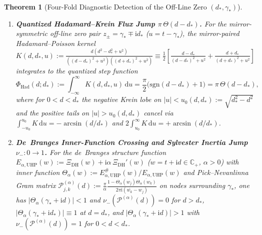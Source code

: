 \documentclass[11pt,reqno]{amsart}
\newtheorem{theorem}{Theorem}[section]
\theoremstyle{definition}
\theoremstyle{remark}
\numberwithin{equation}{section}
\newcommand{\C}{\mathbb{C}}
\newcommand{\dd}{\mathrm{d}}
\newcommand{\ii}{\mathrm{i}}
\newcommand{\sgn}{\mathrm{sgn}}
\newcommand{\DHf}{\mathrm{DH}}
\begin{document}
\begin{theorem}[Four-Fold Diagnostic Detection of the Off-Line Zero $(d_*, \gamma_*)$]
\begin{enumerate}[label=\textup{(\roman*)},leftmargin=2.2em]
\begin{equation}\label{eq:reversed_integral_law}
\int_{0}^{d_*} u\,\widetilde{W}_{\DHf}(u, \gamma_*)\,\dd u = -\frac{1}{2}\bigl|\Xi_{\DHf}(\gamma_*)\bigr|^2 = -1.8104274824 \times 10^{-58} < 0.
\end{equation}
\item \textbf{Quantized Hadamard--Krein Flux Jump $\pi\,\Theta(d - d_*)$.} For the mirror-symmetric off-line zero pair $z_\pm = \gamma_* \mp \ii d_*$ ($u = t - \gamma_*$), the mirror-paired Hadamard--Poisson kernel $K(d, d_*, u) := \frac{d(d^2 - d_*^2 + u^2)}{((d-d_*)^2+u^2)((d+d_*)^2+u^2)} \equiv \frac{1}{2}[\frac{d-d_*}{(d-d_*)^2+u^2} + \frac{d+d_*}{(d+d_*)^2+u^2}]$ integrates to the quantized step function
\begin{equation}\label{eq:hadamard_flux_step}
\Phi_{\mathrm{Had}}(d; d_*) := \int_{-\infty}^{\infty} K(d, d_*, u)\,\dd u = \frac{\pi}{2}\bigl(\sgn(d - d_*) + 1\bigr) = \pi\,\Theta(d - d_*),
\end{equation}
where for $0 < d < d_*$ the negative Krein lobe on $|u| < u_0(d, d_*) := \sqrt{d_*^2 - d^2}$ and the positive tails on $|u| > u_0(d, d_*)$ cancel via $\int_{-u_0}^{u_0} K\,\dd u = -\arcsin(d/d_*)$ and $2\int_{u_0}^\infty K\,\dd u = +\arcsin(d/d_*)$.
\item \textbf{De~Branges Inner-Function Crossing and Sylvester Inertia Jump $\nu_- : 0 \to 1$.} For the de~Branges structure function $E_{\alpha,\mathrm{UHP}}(w) := \Xi_{\DHf}(w) + \ii\alpha\,\Xi_{\DHf}'(w)$ ($w = t + \ii d \in \C_+$, $\alpha > 0$) with inner function $\Theta_\alpha(w) := E_{\alpha,\mathrm{UHP}}^\#(w)/E_{\alpha,\mathrm{UHP}}(w)$ and Pick--Nevanlinna Gram matrix $\mathcal{P}_{j,k}^{(\alpha)}(d) := \frac{\pi}{\alpha}\frac{1 - \Theta_\alpha(w_j)\overline{\Theta_\alpha(w_k)}}{2\pi\ii(\overline{w_k} - w_j)}$ on nodes surrounding $\gamma_*$, one has $|\Theta_\alpha(\gamma_* + \ii d)| < 1$ and $\nu_-(\mathcal{P}^{(\alpha)}(d)) = 0$ for $d > d_*$, $|\Theta_\alpha(\gamma_* + \ii d_*)| \equiv 1$ at $d = d_*$, and $|\Theta_\alpha(\gamma_* + \ii d)| > 1$ with $\nu_-(\mathcal{P}^{(\alpha)}(d)) = 1$ for $0 < d < d_*$.
\end{enumerate}
\end{theorem}
\end{document}
